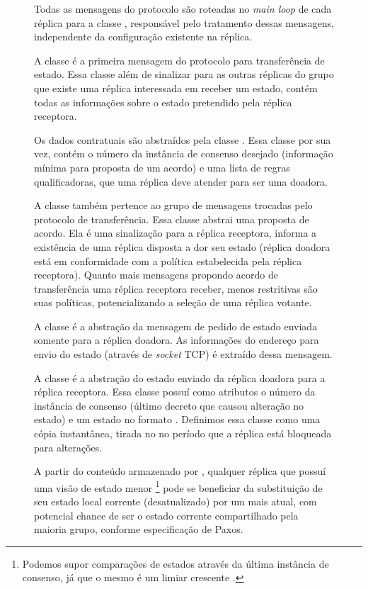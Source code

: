 \begin{figure}[ht]
Todas as mensagens do protocolo são roteadas no \emph{main loop} de cada réplica para a
classe , responsável pelo tratamento dessas mensagens, independente da
configuração existente na réplica.


A classe  é a primeira mensagem do protocolo para transferência
de estado. Essa classe além de sinalizar para as outras réplicas do grupo que existe uma
réplica interessada em receber um estado, contém todas as informações sobre o estado
pretendido pela réplica receptora.

Os dados contratuais são abstraídos pela classe . Essa classe por sua
vez, contém o número da instância de consenso desejado (informação mínima para proposta de
um acordo) e uma lista de regras qualificadoras, que uma réplica deve atender para ser uma
doadora.


A classe  também pertence ao grupo de mensagens trocadas pelo
protocolo de transferência. Essa classe abstrai uma proposta de acordo. Ela é uma
sinalização para a réplica receptora, informa a existência de uma réplica disposta a dor
seu estado (réplica doadora está em conformidade com a política estabelecida pela réplica
receptora). Quanto mais mensagens propondo acordo de transferência uma réplica receptora
receber, menos restritivas são suas políticas, potencializando a seleção de uma réplica
votante.


A classe  é a abstração da mensagem de pedido de estado enviada
somente para a réplica doadora. As informações do endereço para envio do estado (através
de \emph{socket} TCP) é extraído dessa mensagem.


A classe  é a abstração do estado enviado da réplica doadora para
a réplica receptora. Essa classe possuí como atributos o número da instância de consenso
(último decreto que causou alteração no estado) e um estado no formato
. Definimos essa classe como uma cópia instantânea, tirada
no no período que a réplica está bloqueada para alterações.

A partir do conteúdo armazenado por , qualquer réplica que possuí
uma visão de estado menor \footnote{Podemos supor comparações de estados através da última
instância de consenso, já que o mesmo é um limiar crescente \cite{vieira-10b}.} pode se
beneficiar da substituição de seu estado local corrente (desatualizado) por um mais atual,
com potencial chance de ser o estado corrente compartilhado pela maioria grupo, conforme
especificação de Paxos.


\end{figure}

